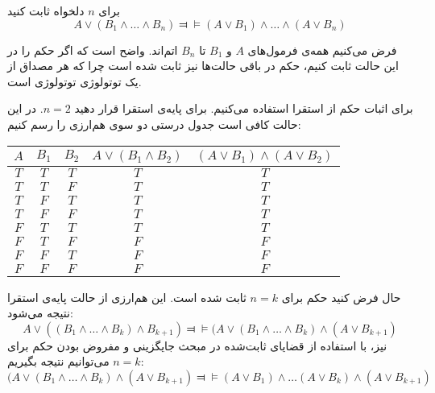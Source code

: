 برای $n$ دلخواه ثابت کنید
$$
A\vee (B_1\wedge\ldots\wedge B_n)\Dashv\vDash(A\vee B_1)\wedge\ldots\wedge(A\vee B_n)
$$
\begin{ans}
فرض می‌کنیم همه‌ی فرمول‌های $A$ و $B_1$ تا $B_n$ اتم‌اند. واضح است که اگر حکم را در این حالت ثابت کنیم، حکم در باقی حالت‌ها نیز ثابت شده است چرا که هر مصداق از یک توتولوژی توتولوژی است.

برای اثبات حکم از استقرا استفاده می‌کنیم. برای پایه‌ی استقرا قرار دهید $n=2$. در این حالت کافی است جدول درستی دو سوی هم‌ارزی را رسم کنیم:

\begin{tabular}{c|c|c|c|c}
$A$ & $B_1$ & $B_2$ & $A\vee(B_1\wedge B_2)$ & $(A\vee B_1)\wedge(A\vee B_2)$ \\
\hline
$T$ & $T$ & $T$ & $T$ & $T$ \\
$T$ & $T$ & $F$ & $T$ & $T$ \\
$T$ & $F$ & $T$ & $T$ & $T$ \\
$T$ & $F$ & $F$ & $T$ & $T$ \\
$F$ & $T$ & $T$ & $T$ & $T$ \\
$F$ & $T$ & $F$ & $F$ & $F$ \\
$F$ & $F$ & $T$ & $F$ & $F$ \\
$F$ & $F$ & $F$ & $F$ & $F$ \\
\end{tabular}

حال فرض کنید حکم برای $n=k$ ثابت شده است. این هم‌ارزی از حالت پایه‌ی استقرا نتیجه می‌شود:
$$
A\vee ((B_1\wedge\ldots\wedge B_k)\wedge B_{k+1})\Dashv\vDash (A\vee (B_1\wedge\ldots\wedge B_k)\wedge (A\vee B_{k+1})
$$
نیز، با استفاده از قضایای ثابت‌شده در مبحث جایگزینی و مفروض بودن حکم برای $n=k$ می‌توانیم نتیجه بگیریم:
$$
(A\vee (B_1\wedge\ldots\wedge B_k)\wedge (A\vee B_{k+1})\Dashv\vDash(A\vee B_1)\wedge\ldots(A\vee B_k)\wedge(A\vee B_{k+1})
$$

\end{ans}